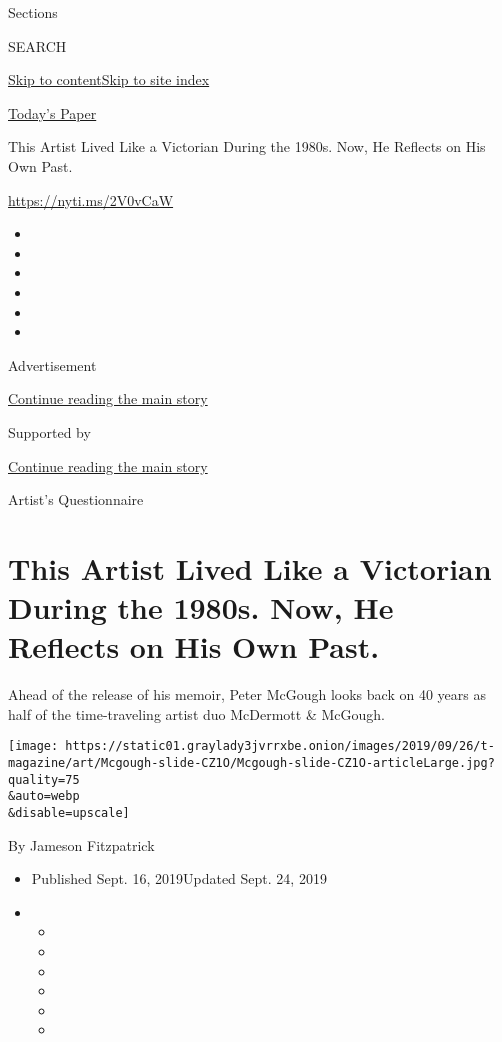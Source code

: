 Sections

SEARCH

\protect\hyperlink{site-content}{Skip to
content}\protect\hyperlink{site-index}{Skip to site index}

\href{https://myaccount.nytimes3xbfgragh.onion/auth/login?response_type=cookie\&client_id=vi}{}

\href{https://www.nytimes3xbfgragh.onion/section/todayspaper}{Today's
Paper}

This Artist Lived Like a Victorian During the 1980s. Now, He Reflects on
His Own Past.

\url{https://nyti.ms/2V0vCaW}

\begin{itemize}
\item
\item
\item
\item
\item
\item
\end{itemize}

Advertisement

\protect\hyperlink{after-top}{Continue reading the main story}

Supported by

\protect\hyperlink{after-sponsor}{Continue reading the main story}

Artist's Questionnaire

\hypertarget{this-artist-lived-like-a-victorian-during-the-1980s-now-he-reflects-on-his-own-past}{%
\section{This Artist Lived Like a Victorian During the 1980s. Now, He
Reflects on His Own
Past.}\label{this-artist-lived-like-a-victorian-during-the-1980s-now-he-reflects-on-his-own-past}}

Ahead of the release of his memoir, Peter McGough looks back on 40 years
as half of the time-traveling artist duo McDermott \& McGough.

\texttt{[image: https://static01.graylady3jvrrxbe.onion/images/2019/09/26/t-magazine/art/Mcgough-slide-CZ1O/Mcgough-slide-CZ1O-articleLarge.jpg?quality=75\\\&auto=webp\\\&disable=upscale]}

By Jameson Fitzpatrick

\begin{itemize}
\item
  Published Sept. 16, 2019Updated Sept. 24, 2019
\item
  \begin{itemize}
  \item
  \item
  \item
  \item
  \item
  \item
  \end{itemize}
\end{itemize}

